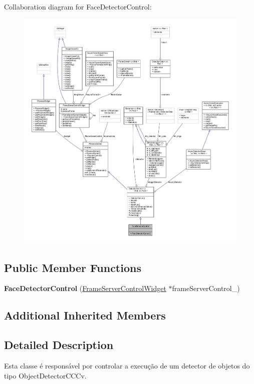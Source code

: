 Collaboration diagram for Face\+Detector\+Control\+:
\nopagebreak
\begin{figure}[H]
\begin{center}
\leavevmode
\includegraphics[width=350pt]{class_face_detector_control__coll__graph}
\end{center}
\end{figure}
\subsection*{Public Member Functions}
\begin{DoxyCompactItemize}
\item 
\hypertarget{class_face_detector_control_ab3732f3d867a62556862f26249e185ea}{}{\bfseries Face\+Detector\+Control} (\hyperlink{class_frame_server_control_widget}{Frame\+Server\+Control\+Widget} $\ast$frame\+Server\+Control\+\_\+)\label{class_face_detector_control_ab3732f3d867a62556862f26249e185ea}

\end{DoxyCompactItemize}
\subsection*{Additional Inherited Members}


\subsection{Detailed Description}
Esta classe é responsável por controlar a execução de um detector de objetos do tipo Object\+Detector\+C\+C\+Cv. 

